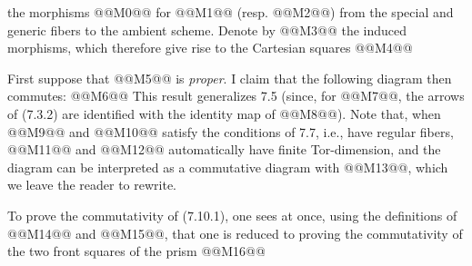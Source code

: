
the morphisms @@M0@@ for @@M1@@ (resp. @@M2@@) from the special and generic fibers to the ambient scheme. Denote by
@@M3@@
the induced morphisms, which therefore give rise to the Cartesian squares
@@M4@@

First suppose that @@M5@@ is \emph{proper}. I claim that the following diagram then commutes:
@@M6@@
This result generalizes 7.5 (since, for @@M7@@, the arrows of (7.3.2) are identified with the identity map of @@M8@@). Note that, when @@M9@@ and @@M10@@ satisfy the conditions of 7.7, i.e., have regular fibers, @@M11@@ and @@M12@@ automatically have finite Tor-dimension, and the diagram can be interpreted as a commutative diagram with @@M13@@, which we leave the reader to rewrite.

To prove the commutativity of (7.10.1), one sees at once, using the definitions of @@M14@@ and @@M15@@, that one is reduced to proving the commutativity of the two front squares of the prism
@@M16@@
